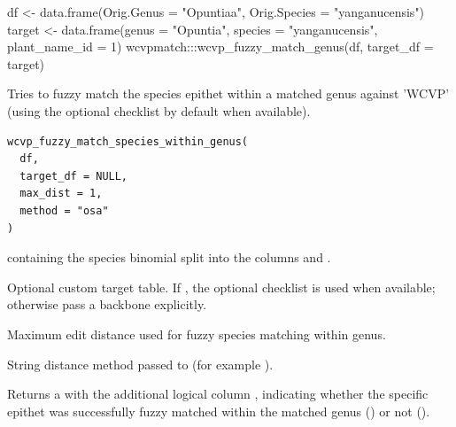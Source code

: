 \documentclass[a4paper]{book}
\begin{document}
%
\begin{Examples}
\begin{ExampleCode}

df <- data.frame(Orig.Genus = "Opuntiaa", Orig.Species = "yanganucensis")
target <- data.frame(genus = "Opuntia", species = "yanganucensis", plant_name_id = 1)
wcvpmatch:::wcvp_fuzzy_match_genus(df, target_df = target)

\end{ExampleCode}
\end{Examples}
%
\begin{Description}
\strong{[Stable]}

Tries to fuzzy match the species epithet within a matched genus against 'WCVP' (using the optional  checklist by default when available).
\end{Description}
%
\begin{Usage}
\begin{verbatim}
wcvp_fuzzy_match_species_within_genus(
  df,
  target_df = NULL,
  max_dist = 1,
  method = "osa"
)
\end{verbatim}
\end{Usage}
%
\begin{Arguments}
\begin{ldescription}
\item[\code{df}]  containing the species binomial split into the columns  and .

\item[\code{target\_df}] Optional custom target table. If , the optional  checklist is used when available; otherwise pass a backbone explicitly.

\item[\code{max\_dist}] Maximum edit distance used for fuzzy species matching within genus.

\item[\code{method}] String distance method passed to  (for example ).
\end{ldescription}
\end{Arguments}
%
\begin{Value}
Returns a  with the additional logical column , indicating whether the specific epithet was successfully fuzzy matched within the matched genus () or not ().
\end{Value}
\end{document}
